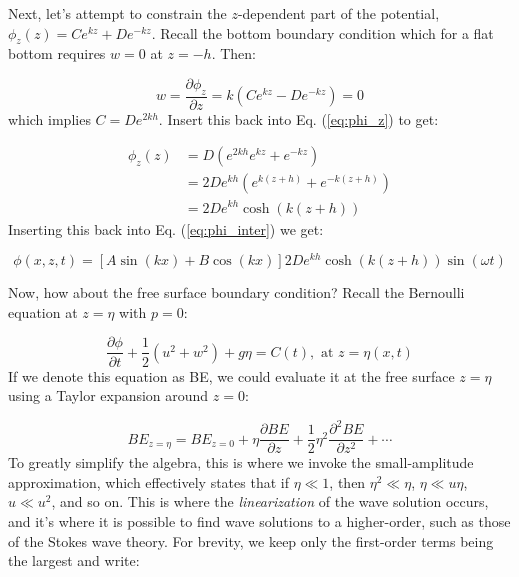 \documentclass[12pt]{article}
\numberwithin{equation}{section}
\numberwithin{figure}{section}
\numberwithin{table}{section}
\begin{document}
Next, let's attempt to constrain the $z$-dependent part of the potential,
$\phi_z(z) = C e^{kz} + D e^{-kz}$.
Recall the bottom boundary condition which for a flat bottom requires $w = 0$
at $z = -h$.
Then:

\begin{equation}
  w = \frac{\partial \phi_z}{\partial z} = k \left( C e^{kz} - D e^{-kz} \right) = 0
\end{equation}
which implies $C = D e^{2kh}$.
Insert this back into Eq. (\ref{eq:phi_z}) to get:

\begin{equation}
  \begin{split}
    \phi_z(z) &=
    D \left( e^{2kh} e^{kz} + e^{-kz} \right) \\
    &=
    2 D e^{kh} \left( e^{k(z+h)} + e^{-k(z+h)} \right) \\
    &=
    2 D e^{kh} \cosh\left( k(z+h) \right)
  \end{split}
\end{equation}
Inserting this back into Eq. (\ref{eq:phi_inter}) we get:

\begin{equation}
  \phi(x, z, t) = \left[ A \sin(kx) + B \cos(kx) \right] 2 D e^{kh} \cosh\left( k(z+h) \right) \sin(\omega t)
  \label{eq:phi_inter2}
\end{equation}

Now, how about the free surface boundary condition?
Recall the Bernoulli equation at $z = \eta$ with $p = 0$:

\begin{equation}
  \frac{\partial \phi}{\partial t} + \frac{1}{2} \left(u^2 + w^2\right) + g\eta = C(t), \text{ at } z=\eta(x, t)
  \label{eq:bernoulli_free_surface}
\end{equation}
If we denote this equation as BE, we could evaluate it at the free surface
$z = \eta$ using a Taylor expansion around $z = 0$:

\begin{equation}
  BE_{z=\eta} = BE_{z=0} +
  \eta \frac{\partial{BE}}{\partial z} +
  \frac{1}{2} \eta^2 \frac{\partial^2{BE}}{\partial z^2} + \cdots
\end{equation}
To greatly simplify the algebra, this is where we invoke the small-amplitude
approximation, which effectively states that if $\eta \ll 1$, then 
$\eta^2 \ll \eta$, $\eta \ll u \eta$, $u \ll u^2$, and so on.
This is where the \textit{linearization} of the wave solution occurs, and it's
where it is possible to find wave solutions to a higher-order, such as those
of the Stokes wave theory.
For brevity, we keep only the first-order terms being the largest and write:
\end{document}
